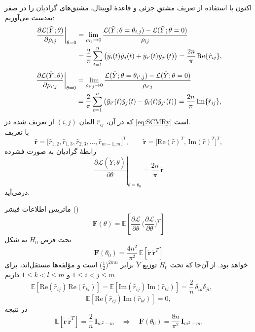 \begin{اثبات}
	اکنون با استفاده از تعریف مشتقِ جزئی و قاعدهٔ لوپیتال، مشتق‌های گرادیان را در صفر به‌دست می‌آوریم:
	\begin{align}
	\left.\frac{\partial \mathcal{L}(\tilde Y;\theta)}{\partial \rho_{ij}}\right|_{\theta=0}
	&=\lim_{\rho_{ij}\to 0}\frac{\mathcal{L}(\tilde Y;\theta=\theta_{i,j})-\mathcal{L}(\tilde Y;\theta=0)}{\rho_{ij}} \notag \\
	&=\frac{2}{\pi}\sum_{t=1}^{n}\big(\tilde y_i(t)\tilde y_j(t)+\tilde y_{i'}(t)\tilde y_{j'}(t)\big)
	=\frac{2n}{\pi}\,\mathrm{Re}\{\hat r_{ij}\},
	\end{align}
	\begin{align}
	\left.\frac{\partial \mathcal{L}(\tilde Y;\theta)}{\partial \rho_{i'j}}\right|_{\theta=0}
	&=\lim_{\rho_{i'j}\to 0}\frac{\mathcal{L}(\tilde Y;\theta=\theta_{i',j})-\mathcal{L}(\tilde Y;\theta=0)}{\rho_{i'j}} \notag \\
	&=\frac{2}{\pi}\sum_{t=1}^{n}\big(\tilde y_{i'}(t)\tilde y_{j}(t)-\tilde y_{i}(t)\tilde y_{j'}(t)\big)
	=\frac{2n}{\pi}\,\mathrm{Im}\{\hat r_{ij}\},
	\end{align}
	که در آن،
	$
	\hat r_{ij}
	$
	المان 
	$(i, j)$
	از  تعریف شده در \eqref{eq:SCMRy} است.\\
	با تعریف
	\[
	\hat{\mathbf{r}}=\big[\hat r_{1,2},\hat r_{1,3},\hat r_{2,3},\ldots,\hat r_{m-1,m}\big]^{T},\qquad
	\tilde{\mathbf{r}}=\big[\mathrm{Re}(\hat r)^{T},\,\mathrm{Im}(\hat r)^{T}\big]^{T},
	\]
	رابطهٔ گرادیان به صورت فشرده
	\begin{equation}
	\left.\frac{\partial \mathcal{L}(\tilde Y;\theta)}{\partial \theta}\right|_{\theta=\theta_0}
	=\frac{2n}{\pi}\,\tilde{\mathbf{r}}
	\end{equation}
	درمی‌آید.
	
	ماتریس اطلاعات فیشر ()
	\[
	\mathbf{F}(\theta)=\mathbb{E}\!\left[\frac{\partial \mathcal{L}}{\partial \theta}\,
	\Big(\frac{\partial \mathcal{L}}{\partial \theta}\Big)^{\!T}\right]
	\]
	تحت فرض \(H_0\) به شکل
	\begin{equation}
	\mathbf{F}(\theta_0)=\frac{4n^{2}}{\pi^{2}}\,
	\mathbb{E}\!\left[\tilde{\mathbf{r}}\,\tilde{\mathbf{r}}^{T}\right]
	\end{equation}
	خواهد بود. از آن‌جا که تحت \(H_0\) توزیع \(\tilde Y\) برابر \(\big(\tfrac{1}{2}\big)^{2mn}\) است
	و مؤلفه‌ها مستقل‌اند، برای \(1\le i<j\le m\) و \(1\le k<l\le m\) داریم
	\begin{equation}
	\mathbb{E}\!\left[\mathrm{Re}(\hat r_{ij})\,\mathrm{Re}(\hat r_{kl})\right]
	=\mathbb{E}\!\left[\mathrm{Im}(\hat r_{ij})\,\mathrm{Im}(\hat r_{kl})\right]
	=\frac{2}{n}\,\delta_{ik}\delta_{jl},\qquad
	\end{equation}
	\begin{equation}
	\mathbb{E}\!\left[\mathrm{Re}(\hat r_{ij})\,\mathrm{Im}(\hat r_{kl})\right]=0,
	\end{equation}
	در نتیجه
	\begin{equation}
	\mathbb{E}\!\left[\tilde{\mathbf{r}}\,\tilde{\mathbf{r}}^{T}\right]=\frac{2}{n}\,\mathbf{I}_{m^{2}-m}
	\quad\Longrightarrow\quad
	\mathbf{F}(\theta_0)=\frac{8n}{\pi^{2}}\,\mathbf{I}_{m^{2}-m}.
	\end{equation}
	

\end{اثبات}
